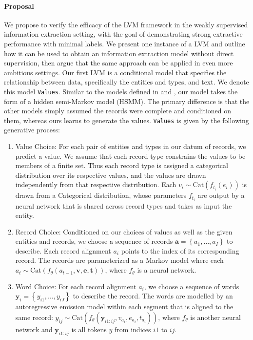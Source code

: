 \documentclass[11pt]{article}
\newcommand\set[1]{\left\{#1\right\}}
\newcommand{\Cat}{\mathrm{Cat}}
\newcommand{\ba}{\mathbf{a}}
\newcommand{\be}{\mathbf{e}}
\newcommand{\bt}{\mathbf{t}}
\newcommand{\bv}{\mathbf{v}}
\newcommand{\by}{\mathbf{y}}
\begin{document}
\paragraph{Proposal}
We propose to verify the efficacy of the LVM framework in the
weakly supervised information extraction setting,
with the goal of demonstrating strong extractive performance with minimal labels.
We present one instance of a LVM and outline how it can be used to obtain
an information extraction model without direct supervision,
then argue that the same approach can be applied in even more ambitious settings.
Our first LVM is a conditional model that specifies
the relationship between data, specifically the entities and types, and text.
We denote this model \texttt{Values}.
Similar to the models defined in \citet{wiseman2018template} and \citet{liang2009semalign},
our model takes the form of a hidden semi-Markov model (HSMM).
The primary difference is that the other models simply assumed the records
were complete and conditioned on them, whereas ours learns to generate the values.
\texttt{Values} is given by the following generative process:
\begin{enumerate}
\item Value Choice:
For each pair of entities and types in our datum of records, we predict a value.
We assume that each record type constrains the values to be members of a finite set.
Thus each record type is assigned a categorical distribution over its respective values,
and the values are drawn independently from that respective distribution.
Each $v_i\sim\Cat(f_{t_i}(e_i))$ is drawn from a Categorical distribution,
whose parameters $f_{t_i}$ are output by a neural network that is shared across record types
and takes as input the entity.
\item Record Choice:
Conditioned on our choices of values as well as the given entities and records,
we choose a sequence of records $\ba = \set{a_1,\ldots,a_I}$ to describe.
Each record alignment $a_i$ points to the index of its corresponding record.
The records are parameterized as a Markov model where each
$a_t\sim\Cat(f_\theta(a_{t-1},\bv,\be,\bt))$,
where $f_\theta$ is a neural network.
\item Word Choice:
For each record alignment $a_i$,
we choose a sequence of words $\by_i = \set{y_{i1},\ldots,y_{iJ}}$ to describe the record.
The words are modelled by an autoregressive emission model within each segment
that is aligned to the same record:
$y_{ij}\sim\Cat(f_\theta(\by_{i1:ij},v_{a_i},e_{a_i},t_{a_i}))$,
where $f_\theta$ is another neural network and $\by_{i1:ij}$ is all tokens $y$ from indices
$i1$ to $ij$.
\end{enumerate}
\end{document}
